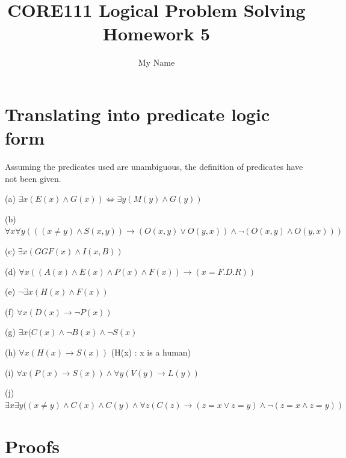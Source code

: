 \documentclass{article}
\title{CORE111 Logical Problem Solving\\Homework 5}
\author{My Name}
\begin{document}
\maketitle

\section{Translating into predicate logic form}

Assuming the predicates used are unambiguous, the definition of predicates have not been given.

(a) $\exists x (E(x) \wedge G(x)) \iff \exists y (M(y) \wedge G(y)) $

(b) $\forall x \forall y (((x \neq y) \wedge S(x,y)) \rightarrow (O(x,y) \vee O(y,x)) \wedge \neg (O(x,y) \wedge O(y,x)))$

(c) $\exists x (GGF(x) \wedge I(x,B))$

(d) $\forall x ((A(x) \wedge E(x) \wedge P(x) \wedge F(x)) \rightarrow (x=F.D.R)) $

(e) $\neg \exists x (H(x) \wedge F(x))$

(f) $\forall x (D(x) \rightarrow \neg P(x))$

(g) $\exists x (C(x) \wedge \neg B(x) \wedge \neg S(x)$

(h) $\forall x (H(x) \rightarrow S(x))$ (H(x) : x is a human)

(i) $\forall x (P(x) \rightarrow S(x)) \wedge \forall y (V(y) \rightarrow L(y))$

(j) $\exists x \exists y ((x \neq y) \wedge C(x) \wedge C(y) \wedge \forall z (C(z) \rightarrow (z=x \vee z=y)\wedge \neg (z=x \wedge z=y))$

\section{Proofs}
\end{document}
